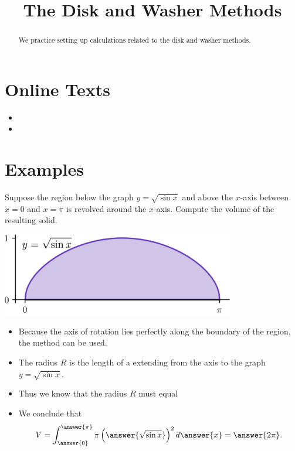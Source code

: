 \documentclass{ximera}
\title{The Disk and Washer Methods}
\begin{document}
\begin{abstract}
  We practice setting up calculations related to the disk and washer methods.
\end{abstract}
\maketitle

\section*{Online Texts}
\begin{itemize}
\item {}
\item {}
\end{itemize}

\section*{Examples}

\begin{example}
Suppose the region below the graph $y = \sqrt{\sin x}$ and above the $x$-axis between $x=0$ and $x=\pi$ is revolved around the $x$-axis. Compute the volume of the resulting solid.
\begin{center}
\begin{image}
\includegraphics[width=4in]{diskwasher/disksin.png}
\end{image}
\end{center}
\begin{itemize}
\item Because the axis of rotation lies perfectly along the boundary of the region, the  method can be used.
\item The radius $R$ is the length of a  extending from the axis to the graph $y = \sqrt{\sin x}$.
\item Thus we know that the radius $R$ must equal
\begin{multipleChoice}\end{multipleChoice}
\item We conclude that
\[ V = \int_{\answer{0}}^{\answer{\pi}} \pi \left( \answer{\sqrt{\sin x}} \right)^2 d\answer{x} = \answer{2\pi}. \]
\end{itemize}
\end{example}
\end{document}
